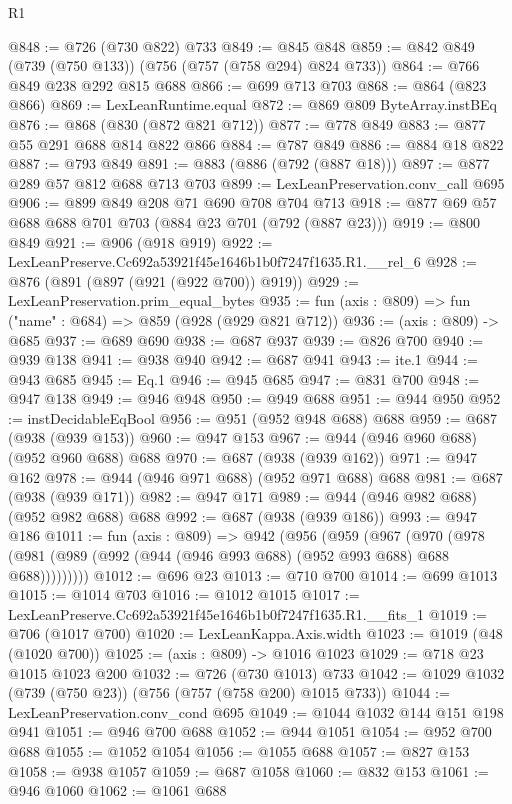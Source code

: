\begin{lexlean}{R1}
\begin{coremodule}
@848 := @726 (@730 @822) @733
@849 := @845 @848
@859 := @842 @849 (@739 (@750 @133)) (@756 (@757 (@758 @294) @824 @733))
@864 := @766 @849 @238 @292 @815 @688
@866 := @699 @713 @703
@868 := @864 (@823 @866)
@869 := LexLeanRuntime.equal
@872 := @869 @809 ByteArray.instBEq
@876 := @868 (@830 (@872 @821 @712))
@877 := @778 @849
@883 := @877 @55 @291 @688 @814 @822 @866
@884 := @787 @849
@886 := @884 @18 @822
@887 := @793 @849
@891 := @883 (@886 (@792 (@887 @18)))
@897 := @877 @289 @57 @812 @688 @713 @703
@899 := LexLeanPreservation.conv_call @695
@906 := @899 @849 @208 @71 @690 @708 @704 @713
@918 := @877 @69 @57 @688 @688 @701 @703 (@884 @23 @701 (@792 (@887 @23)))
@919 := @800 @849
@921 := @906 (@918 @919)
@922 := LexLeanPreserve.Cc692a53921f45e1646b1b0f7247f1635.R1.__rel_6
@928 := @876 (@891 (@897 (@921 (@922 @700)) @919))
@929 := LexLeanPreservation.prim_equal_bytes
@935 := fun (axis : @809) => fun ("name" : @684) => @859 (@928 (@929 @821 @712))
@936 := (axis : @809) -> @685
@937 := @689 @690
@938 := @687 @937
@939 := @826 @700
@940 := @939 @138
@941 := @938 @940
@942 := @687 @941
@943 := ite.{1}
@944 := @943 @685
@945 := Eq.{1}
@946 := @945 @685
@947 := @831 @700
@948 := @947 @138
@949 := @946 @948
@950 := @949 @688
@951 := @944 @950
@952 := instDecidableEqBool
@956 := @951 (@952 @948 @688) @688
@959 := @687 (@938 (@939 @153))
@960 := @947 @153
@967 := @944 (@946 @960 @688) (@952 @960 @688) @688
@970 := @687 (@938 (@939 @162))
@971 := @947 @162
@978 := @944 (@946 @971 @688) (@952 @971 @688) @688
@981 := @687 (@938 (@939 @171))
@982 := @947 @171
@989 := @944 (@946 @982 @688) (@952 @982 @688) @688
@992 := @687 (@938 (@939 @186))
@993 := @947 @186
@1011 := fun (axis : @809) =>
  @942
    (@956
      (@959
        (@967
          (@970 (@978 (@981 (@989 (@992 (@944 (@946 @993 @688) (@952 @993 @688) @688 @688)))))))))
@1012 := @696 @23
@1013 := @710 @700
@1014 := @699 @1013
@1015 := @1014 @703
@1016 := @1012 @1015
@1017 := LexLeanPreserve.Cc692a53921f45e1646b1b0f7247f1635.R1.__fits_1
@1019 := @706 (@1017 @700)
@1020 := LexLeanKappa.Axis.width
@1023 := @1019 (@48 (@1020 @700))
@1025 := (axis : @809) -> @1016 @1023
@1029 := @718 @23 @1015 @1023 @200
@1032 := @726 (@730 @1013) @733
@1042 := @1029 @1032 (@739 (@750 @23)) (@756 (@757 (@758 @200) @1015 @733))
@1044 := LexLeanPreservation.conv_cond @695
@1049 := @1044 @1032 @144 @151 @198 @941
@1051 := @946 @700 @688
@1052 := @944 @1051
@1054 := @952 @700 @688
@1055 := @1052 @1054
@1056 := @1055 @688
@1057 := @827 @153
@1058 := @938 @1057
@1059 := @687 @1058
@1060 := @832 @153
@1061 := @946 @1060
@1062 := @1061 @688

\end{coremodule}
\end{lexlean}
